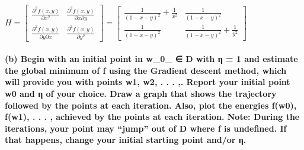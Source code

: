 \documentclass[11pt]{article}
\begin{document}
\(H = \begin{bmatrix} \frac{\partial^2 f(x,y)}{\partial x^2} & \frac{\partial^2 f(x,y)}{\partial x \partial y}\\ \frac{\partial^2 f(x,y)}{\partial y \partial x} & \frac{\partial^2 f(x,y)}{\partial y^2} \end{bmatrix} =\begin{bmatrix} \frac{1}{(1-x-y)^2}+\frac{1}{x^2} & \frac{1}{(1-x-y)^2} \\ \frac{1}{(1-x-y)^2} & \frac{1}{(1-x-y)^2}+\frac{1}{y^2} \end{bmatrix}\)

    \paragraph{(b) Begin with an initial point in w\_0\_ ∈ D with η = 1 and
estimate the global minimum of f using the Gradient descent method,
which will provide you with points w1, w2, . . . ,. Report your initial
point w0 and η of your choice. Draw a graph that shows the trajectory
followed by the points at each iteration. Also, plot the energies f(w0),
f(w1), . . . , achieved by the points at each iteration. Note: During
the iterations, your point may ``jump'' out of D where f is undefined.
If that happens, change your initial starting point and/or
η.}\label{b-begin-with-an-initial-point-in-w_0_-d-with-ux3b7-1-and-estimate-the-global-minimum-of-f-using-the-gradient-descent-method-which-will-provide-you-with-points-w1-w2-.-.-.-.-report-your-initial-point-w0-and-ux3b7-of-your-choice.-draw-a-graph-that-shows-the-trajectory-followed-by-the-points-at-each-iteration.-also-plot-the-energies-fw0-fw1-.-.-.-achieved-by-the-points-at-each-iteration.-note-during-the-iterations-your-point-may-jump-out-of-d-where-f-is-undefined.-if-that-happens-change-your-initial-starting-point-andor-ux3b7.}
\end{document}
